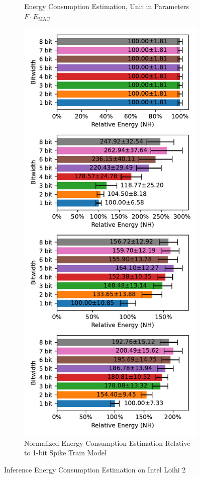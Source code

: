 \begin{figure}[H]
\begin{subfigure}[H]{0.495\textwidth}
                \caption{Energy Consumption Estimation, Unit in Parameters $F\cdot E_{\text{MAC}}$}
            \end{subfigure}
            \hfill
            \begin{subfigure}[H]{0.495\textwidth}
                \includegraphics[width=\textwidth]{../standard/NMNIST/plots/nmnist_test_relative_energy_nh.pdf}
                \caption{Normalized Energy Consumption Estimation Relative to 1-bit Spike Train Model}
            \end{subfigure}
            \caption{Inference Energy Consumption Estimation on Intel Loihi 2}
        \end{figure}

